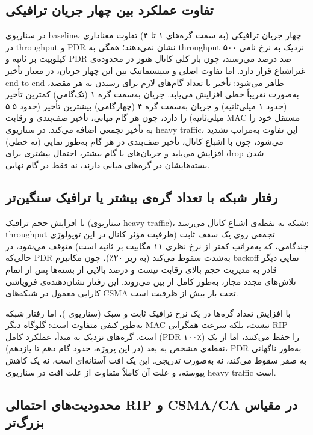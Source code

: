 \documentclass{article}
\begin{document}
	\subsection{تفاوت عملکرد بین چهار جریان ترافیکی}
	
	در سناریوی baseline، چهار جریان ترافیکی (به سمت گره‌های ۱ تا ۴) تفاوت معناداری در throughput و PDR نشان نمی‌دهند؛ همگی به throughput نزدیک به نرخ نامی ۵۰۰ کیلوبیت بر ثانیه و PDR صد درصد می‌رسند، چون بار کلی کانال هنوز در محدوده‌ی غیراشباع قرار دارد. اما تفاوت اصلی و سیستماتیک بین این چهار جریان، در معیار تأخیر end-to-end ظاهر می‌شود: تأخیر با تعداد گام‌های لازم برای رسیدن به هر مقصد، به‌صورت تقریباً خطی افزایش می‌یابد. جریان به‌سمت گره ۱ (تک‌گامی) کمترین تأخیر (حدود ۱ میلی‌ثانیه) و جریان به‌سمت گره ۴ (چهارگامی) بیشترین تأخیر (حدود ۵.۵ میلی‌ثانیه) را دارد، چون هر گام میانی، تأخیر صف‌بندی و رقابت MAC مستقل خود را به تأخیر تجمعی اضافه می‌کند. در سناریوی heavy traffic، این تفاوت به‌مراتب تشدید می‌شود، چون با اشباع کانال، تأخیر صف‌بندی در هر گام به‌طور نمایی (نه خطی) افزایش می‌یابد و جریان‌های با گام بیشتر، احتمال بیشتری برای drop شدن بسته‌هایشان در گره‌های میانی دارند، نه فقط در گام نهایی.
	
	\subsection{رفتار شبکه با تعداد گره‌ی بیشتر یا ترافیک سنگین‌تر}
	
	با افزایش حجم ترافیک (سناریوی heavy traffic)، شبکه به نقطه‌ی اشباع کانال می‌رسد: throughput تجمعی روی یک سقف ثابت (ظرفیت مؤثر کانال  در این توپولوژی چندگامی، که به‌مراتب کمتر از نرخ نظری ۱۱ مگابیت بر ثانیه است) متوقف می‌شود، در حالی‌که PDR به‌شدت سقوط می‌کند (به زیر ۲۰٪)، چون مکانیزم backoff نمایی دیگر قادر به مدیریت حجم بالای رقابت نیست و درصد بالایی از بسته‌ها پس از اتمام تلاش‌های مجدد مجاز، به‌طور کامل از بین می‌روند. این رفتار نشان‌دهنده‌ی فروپاشی کارایی 
	 معمول در شبکه‌های CSMA تحت بار بیش از ظرفیت است.
	
	با افزایش تعداد گره‌ها در یک نرخ ترافیک ثابت و سبک (سناریوی )، اما رفتار شبکه به‌طور کیفی متفاوت است: گلوگاه دیگر MAC نیست، بلکه سرعت همگرایی RIP است. گره‌های نزدیک به مبدأ، عملکرد کامل (PDR ۱۰۰٪) را حفظ می‌کنند، اما از یک نقطه‌ی مشخص به بعد (در این پروژه، حدود گام دهم تا یازدهم)، PDR به‌طور ناگهانی به صفر سقوط می‌کند، نه به‌صورت تدریجی. این یک افت آستانه‌ای 
	است، نه یک کاهش پیوسته، و علت آن کاملاً متفاوت از علت افت در سناریوی heavy traffic است.
	
	\subsection{محدودیت‌های احتمالی RIP و CSMA/CA در مقیاس بزرگ‌تر}
	
\end{document}
